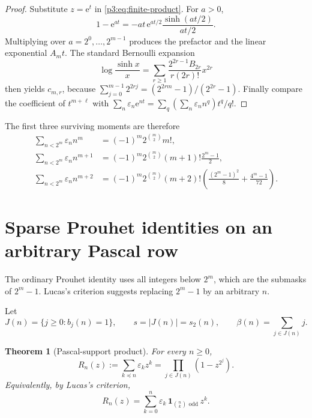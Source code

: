 \documentclass[11pt,oneside]{article}
\newtheorem{theorem}{Theorem}[section]
\theoremstyle{definition}
\theoremstyle{remark}
\newcommand{\swt}{s_2}
\newcommand{\e}{\mathrm e}
\newcommand{\eps}{\varepsilon}
\newcommand{\submask}{\preccurlyeq}
\newcommand{\1}{\mathbf 1}
\begin{document}
\begin{proof}
Substitute \(z=\e^t\) in \eqref{p3:eq:finite-product}.  For \(a>0\),
\[
 1-\e^{at}=-at\,\e^{at/2}\frac{\sinh(at/2)}{at/2}.
\]
Multiplying over \(a=2^0,\ldots,2^{m-1}\) produces the prefactor and the linear exponential
\(A_mt\).  The standard Bernoulli expansion
\[
 \log\frac{\sinh x}{x}
 =\sum_{r\ge1}\frac{2^{2r-1}B_{2r}}{r(2r)!}x^{2r}
\]
then yields \(c_{m,r}\), because
\(\sum_{j=0}^{m-1}2^{2rj}=(2^{2rm}-1)/(2^{2r}-1)\).  Finally compare the coefficient of
\(t^{m+\ell}\) with
\(\sum_n\eps_n\e^{nt}=\sum_q(\sum_n\eps_nn^q)t^q/q!\).
\end{proof}

The first three surviving moments are therefore
\begin{align}
 \sum_{n<2^m}\eps_nn^m
 &=(-1)^m2^{\binom m2}m!,                                  \label{p3:eq:mom0}\\
 \sum_{n<2^m}\eps_nn^{m+1}
 &=(-1)^m2^{\binom m2}(m+1)!\frac{2^m-1}{2},               \label{p3:eq:mom1}\\
 \sum_{n<2^m}\eps_nn^{m+2}
 &=(-1)^m2^{\binom m2}(m+2)!
   \left(\frac{(2^m-1)^2}{8}+\frac{4^m-1}{72}\right).     \label{p3:eq:mom2}
\end{align}

\section{Sparse Prouhet identities on an arbitrary Pascal row}
\label{p3:sec:sparse}

The ordinary Prouhet identity uses all integers below \(2^m\), which are the submasks of
\(2^m-1\).  Lucas's criterion suggests replacing \(2^m-1\) by an arbitrary \(n\).

Let
\begin{equation}
 J(n)=\{j\ge0:b_j(n)=1\},
 \qquad
 s=|J(n)|=\swt(n),
 \qquad
 \beta(n)=\sum_{j\in J(n)}j.
 \label{p3:eq:J-beta}
\end{equation}

\begin{theorem}[Pascal-support product]
\label{p3:thm:submask-product}
For every \(n\ge0\),
\begin{equation}
 \boxed{
 R_n(z):=\sum_{k\submask n}\eps_kz^k
 =\prod_{j\in J(n)}(1-z^{2^j}).}
 \label{p3:eq:submask-product}
\end{equation}
Equivalently, by Lucas's criterion,
\begin{equation}
 R_n(z)=\sum_{k=0}^{n}
 \eps_k\,\1_{\binom nk\text{ odd}}\,z^k.
 \label{p3:eq:pascal-support-polynomial}
\end{equation}
\end{theorem}
\end{document}
